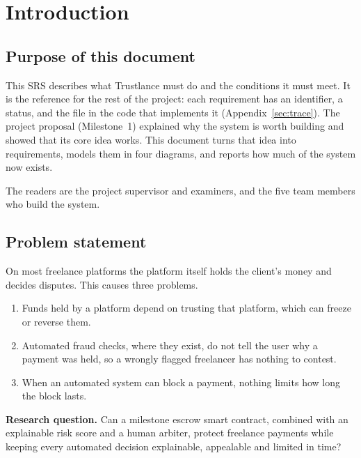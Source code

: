 \chapter{Introduction}
\label{ch:intro}

\section{Purpose of this document}
This SRS describes what Trustlance must do and the conditions it must meet. It is the reference for the rest of the project: each requirement has an identifier, a status, and the file in the code that implements it (Appendix~\ref{sec:trace}). The project proposal (Milestone~1) explained why the system is worth building and showed that its core idea works. This document turns that idea into requirements, models them in four diagrams, and reports how much of the system now exists.

The readers are the project supervisor and examiners, and the five team members who build the system.

\section{Problem statement}
On most freelance platforms the platform itself holds the client's money and decides disputes. This causes three problems.

\begin{enumerate}
\item Funds held by a platform depend on trusting that platform, which can freeze or reverse them.
\item Automated fraud checks, where they exist, do not tell the user why a payment was held, so a wrongly flagged freelancer has nothing to contest.
\item When an automated system can block a payment, nothing limits how long the block lasts.
\end{enumerate}

\textbf{Research question.} Can a milestone escrow smart contract, combined with an explainable risk score and a human arbiter, protect freelance payments while keeping every automated decision explainable, appealable and limited in time?

